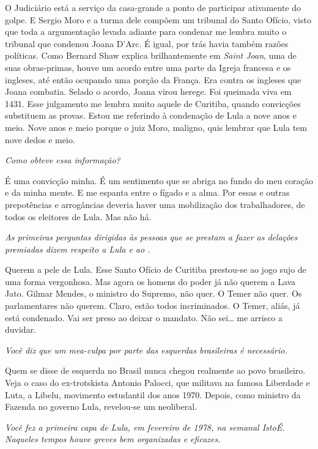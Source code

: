 \normalfont 
O Judiciário está a serviço da casa-grande a ponto de
participar ativamente do golpe. E Sergio Moro e a turma dele compõem um
tribunal do Santo Ofício, visto que toda a argumentação levada adiante
para condenar me lembra muito o tribunal que condenou Joana D'Arc. É
igual, por trás havia também razões políticas. Como Bernard Shaw explica
brilhantemente em \emph{Saint Joan}, uma de suas obras-primas, houve um
acordo entre uma parte da Igreja francesa e os ingleses, até então
ocupando uma porção da França. Era contra os ingleses que Joana
combatia. Selado o acordo, Joana virou herege. Foi queimada viva em
1431. Esse julgamento me lembra muito aquele de Curitiba, quando
convicções substituem as provas. Estou me referindo à condenação de Lula
a nove anos e meio. Nove anos e meio porque o juiz Moro, maligno, quis
lembrar que Lula tem nove dedos e meio.

\itshape
Como obteve essa informação?

\normalfont 
É uma convicção minha. É um sentimento que se abriga no
fundo do meu coração e da minha mente. E me espanta entre o fígado e a
alma. Por essas e outras prepotências e arrogâncias deveria haver uma
mobilização dos trabalhadores, de todos os eleitores de Lula. Mas não
há.

\itshape
As primeiras perguntas dirigidas às pessoas que se
prestam a fazer as delações premiadas dizem respeito a Lula e ao .

\normalfont 
Querem a pele de Lula. Esse Santo Ofício de Curitiba
prestou-se ao jogo sujo de uma forma vergonhosa. Mas agora os homens do
poder já não querem a Lava Jato. Gilmar Mendes, o ministro do Supremo,
não quer. O Temer não quer. Os parlamentares não querem. Claro, estão
todos incriminados. O Temer, aliás, já está condenado. Vai ser preso ao
deixar o mandato. Não sei\ldots{} me arrisco a duvidar.

\itshape
Você diz que um \emph{mea-culpa} por parte das
esquerdas brasileiras é necessário.

\normalfont 
Quem se disse de esquerda no Brasil nunca chegou
realmente ao povo brasileiro. Veja o caso do ex-trotskista Antonio
Palocci, que militava na famosa Liberdade e Luta, a Libelu, movimento
estudantil dos anos 1970. Depois, como ministro da Fazenda no governo
Lula, revelou-se um neoliberal.

\itshape
Você fez a primeira capa de Lula, em fevereiro de 1978,
na semanal \emph{IstoÉ}. Naqueles tempos houve greves bem organizadas e
eficazes.

